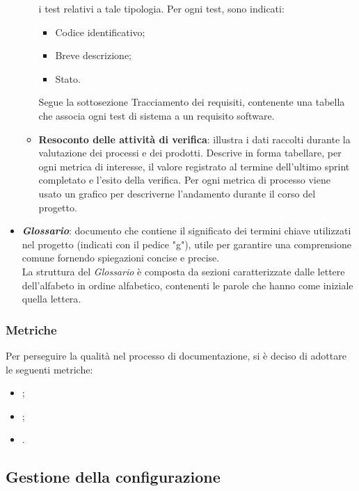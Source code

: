 \begin{itemize}
\begin{itemize}
                        i test relativi a tale tipologia. Per ogni test, sono indicati:
                        \begin{itemize}
                              \item Codice identificativo;
                              \item Breve descrizione;
                              \item Stato.
                        \end{itemize}
                        Segue la sottosezione Tracciamento dei requisiti, contenente una tabella che associa
                        ogni test di sistema a un requisito software.
                  \item \textbf{Resoconto delle attività di verifica}: illustra i dati raccolti durante la valutazione dei processi e dei prodotti.
                        Descrive in forma tabellare, per ogni metrica di interesse, il valore registrato al termine dell'ultimo sprint
                        completato e l'esito della verifica. Per ogni metrica di processo viene usato un grafico per descriverne l'andamento
                        durante il corso del progetto.
            \end{itemize}
      \item \textit{\textbf{Glossario}}: documento che contiene il significato dei termini chiave utilizzati nel progetto (indicati con il pedice "g"), utile per garantire una comprensione comune fornendo spiegazioni concise e precise.
            \\La struttura del \textit{Glossario} è composta da sezioni caratterizzate dalle lettere dell'alfabeto in ordine alfabetico, contenenti le parole che hanno come iniziale quella lettera.
\end{itemize}

\subsubsection{Metriche}
Per perseguire la qualità nel processo di documentazione, si è deciso di
adottare le seguenti metriche:
\begin{itemize}
      \item {};
      \item {};
      \item {}.
\end{itemize}

\subsection{Gestione della configurazione}
